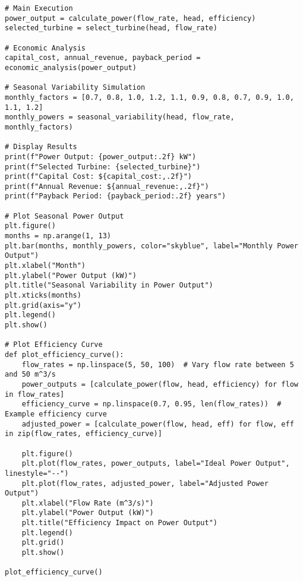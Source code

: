 \documentclass[11pt]{article}
\begin{document}
\begin{lstlisting}[style=custompython, caption=Python Code for Design of a Hydro Power Plant]
# Main Execution
power_output = calculate_power(flow_rate, head, efficiency)
selected_turbine = select_turbine(head, flow_rate)

# Economic Analysis
capital_cost, annual_revenue, payback_period = economic_analysis(power_output)

# Seasonal Variability Simulation
monthly_factors = [0.7, 0.8, 1.0, 1.2, 1.1, 0.9, 0.8, 0.7, 0.9, 1.0, 1.1, 1.2]
monthly_powers = seasonal_variability(head, flow_rate, monthly_factors)

# Display Results
print(f"Power Output: {power_output:.2f} kW")
print(f"Selected Turbine: {selected_turbine}")
print(f"Capital Cost: ${capital_cost:,.2f}")
print(f"Annual Revenue: ${annual_revenue:,.2f}")
print(f"Payback Period: {payback_period:.2f} years")

# Plot Seasonal Power Output
plt.figure()
months = np.arange(1, 13)
plt.bar(months, monthly_powers, color="skyblue", label="Monthly Power Output")
plt.xlabel("Month")
plt.ylabel("Power Output (kW)")
plt.title("Seasonal Variability in Power Output")
plt.xticks(months)
plt.grid(axis="y")
plt.legend()
plt.show()

# Plot Efficiency Curve
def plot_efficiency_curve():
    flow_rates = np.linspace(5, 50, 100)  # Vary flow rate between 5 and 50 m^3/s
    power_outputs = [calculate_power(flow, head, efficiency) for flow in flow_rates]
    efficiency_curve = np.linspace(0.7, 0.95, len(flow_rates))  # Example efficiency curve
    adjusted_power = [calculate_power(flow, head, eff) for flow, eff in zip(flow_rates, efficiency_curve)]

    plt.figure()
    plt.plot(flow_rates, power_outputs, label="Ideal Power Output", linestyle="--")
    plt.plot(flow_rates, adjusted_power, label="Adjusted Power Output")
    plt.xlabel("Flow Rate (m^3/s)")
    plt.ylabel("Power Output (kW)")
    plt.title("Efficiency Impact on Power Output")
    plt.legend()
    plt.grid()
    plt.show()

plot_efficiency_curve()
\end{lstlisting}
\end{document}
